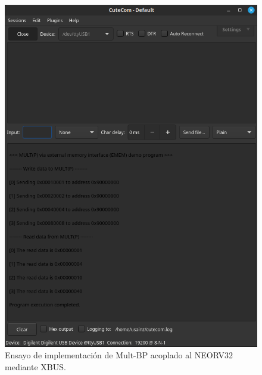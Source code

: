 \begin{figure}[H]
    \centering
    \includegraphics[width=14cm]{Figuras/impl2.png}
    \caption{Ensayo de implementación de Mult-BP acoplado al NEORV32 mediante XBUS.}
    \label{fig:impl2}
\end{figure}

